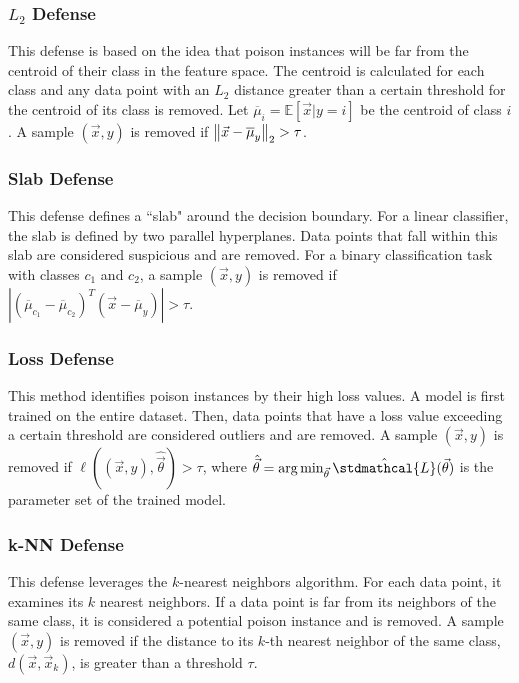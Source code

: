 \documentclass[11pt]{report}
\theoremstyle{remark}
\begin{document}
\subsubsection{$L_2$ Defense}
This defense is based on the idea that poison instances will be far from the centroid of their class in the feature space. The centroid is calculated for each class and any data point with an $L_2$ distance greater than a certain threshold for the centroid of its class is removed. Let $\overline{\mu}_i = \mathbb{E}[\Vec{x}|y=i]$ be the centroid of class $i$. A sample $(\Vec{x}, y)$ is removed if $\left\lVert \Vec{x} - \overline{\mu}_y \right\rVert_2 > \tau$.

\subsubsection[1.]{Slab Defense}
This defense defines a ``slab" around the decision boundary. For a linear classifier, the slab is defined by two parallel hyperplanes. Data points that fall within this slab are considered suspicious and are removed. For a binary classification task with classes $c_1$ and $c_2$, a sample $(\Vec{x}, y)$ is removed if $|(\overline{\mu}_{c_1} - \overline{\mu}_{c_2})^T(\Vec{x} - \overline{\mu}_y)| > \tau$.

\subsubsection{Loss Defense}
This method identifies poison instances by their high loss values. A model is first trained on the entire dataset. Then, data points that have a loss value exceeding a certain threshold are considered outliers and are removed. A sample $(\Vec{x}, y)$ is removed if $\ell((\Vec{x}, y), \hat{\Vec{\theta}}) > \tau$, where $\hat{\Vec{\theta}} = \argmin_{\Vec{\theta}}\hat{\stdmathcal{L}}(\Vec{\theta})$ is the parameter set of the trained model.

\subsubsection{k-NN Defense}
This defense leverages the $k$-nearest neighbors algorithm. For each data point, it examines its $k$ nearest neighbors. If a data point is far from its neighbors of the same class, it is considered a potential poison instance and is removed. A sample $(\Vec{x}, y)$ is removed if the distance to its $k$-th nearest neighbor of the same class, $d(\Vec{x}, \Vec{x}_k)$, is greater than a threshold $\tau$.
\end{document}
